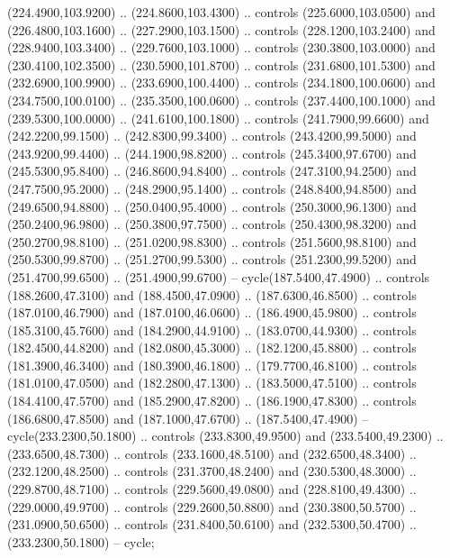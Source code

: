 {\begin{scope}[y=0.80pt, x=0.80pt, yscale=-1, xscale=1, inner sep=0pt, outer sep=0pt, #1]
      (224.4900,103.9200) .. (224.8600,103.4300) .. controls (225.6000,103.0500) and
      (226.4800,103.1600) .. (227.2900,103.1500) .. controls (228.1200,103.2400) and
      (228.9400,103.3400) .. (229.7600,103.1000) .. controls (230.3800,103.0000) and
      (230.4100,102.3500) .. (230.5900,101.8700) .. controls (231.6800,101.5300) and
      (232.6900,100.9900) .. (233.6900,100.4400) .. controls (234.1800,100.0600) and
      (234.7500,100.0100) .. (235.3500,100.0600) .. controls (237.4400,100.1000) and
      (239.5300,100.0000) .. (241.6100,100.1800) .. controls (241.7900,99.6600) and
      (242.2200,99.1500) .. (242.8300,99.3400) .. controls (243.4200,99.5000) and
      (243.9200,99.4400) .. (244.1900,98.8200) .. controls (245.3400,97.6700) and
      (245.5300,95.8400) .. (246.8600,94.8400) .. controls (247.3100,94.2500) and
      (247.7500,95.2000) .. (248.2900,95.1400) .. controls (248.8400,94.8500) and
      (249.6500,94.8800) .. (250.0400,95.4000) .. controls (250.3000,96.1300) and
      (250.2400,96.9800) .. (250.3800,97.7500) .. controls (250.4300,98.3200) and
      (250.2700,98.8100) .. (251.0200,98.8300) .. controls (251.5600,98.8100) and
      (250.5300,99.8700) .. (251.2700,99.5300) .. controls (251.2300,99.5200) and
      (251.4700,99.6500) .. (251.4900,99.6700) -- cycle(187.5400,47.4900) ..
      controls (188.2600,47.3100) and (188.4500,47.0900) .. (187.6300,46.8500) ..
      controls (187.0100,46.7900) and (187.0100,46.0600) .. (186.4900,45.9800) ..
      controls (185.3100,45.7600) and (184.2900,44.9100) .. (183.0700,44.9300) ..
      controls (182.4500,44.8200) and (182.0800,45.3000) .. (182.1200,45.8800) ..
      controls (181.3900,46.3400) and (180.3900,46.1800) .. (179.7700,46.8100) ..
      controls (181.0100,47.0500) and (182.2800,47.1300) .. (183.5000,47.5100) ..
      controls (184.4100,47.5700) and (185.2900,47.8200) .. (186.1900,47.8300) ..
      controls (186.6800,47.8500) and (187.1000,47.6700) .. (187.5400,47.4900) --
      cycle(233.2300,50.1800) .. controls (233.8300,49.9500) and (233.5400,49.2300)
      .. (233.6500,48.7300) .. controls (233.1600,48.5100) and (232.6500,48.3400) ..
      (232.1200,48.2500) .. controls (231.3700,48.2400) and (230.5300,48.3000) ..
      (229.8700,48.7100) .. controls (229.5600,49.0800) and (228.8100,49.4300) ..
      (229.0000,49.9700) .. controls (229.2600,50.8800) and (230.3800,50.5700) ..
      (231.0900,50.6500) .. controls (231.8400,50.6100) and (232.5300,50.4700) ..
      (233.2300,50.1800) -- cycle;


\end{scope}}
